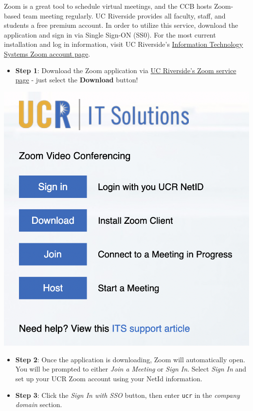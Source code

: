 \documentclass[
]{book}
\providecommand{\tightlist}{%
  \setlength{\itemsep}{0pt}\setlength{\parskip}{0pt}}
\begin{document}
Zoom is a great tool to schedule virtual meetings, and the CCB hosts Zoom-based team meeting regularly. UC Riverside provides all faculty, staff, and students a free premium account. In order to utilize this service, download the application and sign in via Single Sign-ON (SS0). For the most current installation and log in information, visit UC Riverside's \href{https://its.ucr.edu/blog/2019/12/17/changes-ucr-zoom-account-access}{Information Technology Systems Zoom account page}.

\begin{itemize}
\tightlist
\item
  \textbf{Step 1}: Download the Zoom application via \href{https://ucr.zoom.us/}{UC Riverside's Zoom service page} - just select the \textbf{Download} button!
\end{itemize}

\begin{center}\includegraphics[width=12.03in]{images/zoomdownload} \end{center}

\begin{itemize}
\item
  \textbf{Step 2}: Once the application is downloading, Zoom will automatically open. You will be prompted to either \emph{Join a Meeting} or \emph{Sign In}. Select \emph{Sign In} and set up your UCR Zoom account using your NetId information.
\item
  \textbf{Step 3}: Click the \emph{Sign In with SSO} button, then enter \texttt{ucr} in the \emph{company domain} section.
\end{itemize}
\end{document}
